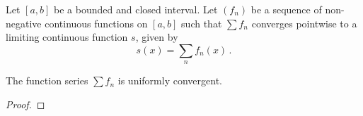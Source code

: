 \documentclass[week=6]{homework}
\begin{document}
\begin{questions}
	    
	    \question
	    Let $[a,b]$ be a bounded and closed interval. Let $(f_n)$ be a sequence of non-negative continuous functions on $[a,b]$ such that $\sum f_n$ converges pointwise to a limiting continuous function $s$, given by
	    \[
		    s(x) = \sum_n f_n(x)\,.
	    \]
	    \begin{toprove}
	    	The function series $\sum f_n$ is uniformly convergent.
	    \end{toprove}
	    \begin{proof}
	    \end{proof}
     \end{questions}
\end{document}
